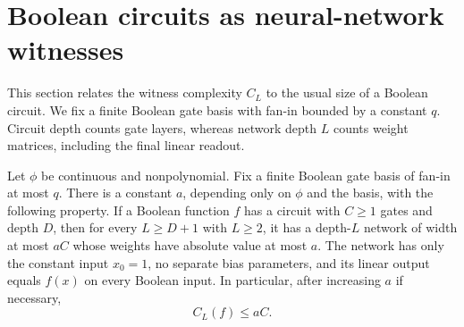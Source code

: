 \section{Boolean circuits as neural-network witnesses}
\label{sec:circuit-simulation}

This section relates the witness complexity $C_L$ to the usual size of a
Boolean circuit. We fix a finite Boolean gate basis with fan-in bounded by a
constant $q$. Circuit depth counts gate layers, whereas network depth $L$
counts weight matrices, including the final linear readout.

\begin{proposition}
\label{prop:circuit-simulation}
Let $\phi$ be continuous and nonpolynomial. Fix a finite Boolean gate basis
of fan-in at most $q$. There is a constant $a$, depending only on $\phi$
and the basis, with the following property. If a Boolean function $f$ has
a circuit with $C\geq1$ gates and depth $D$, then for every $L\geq D+1$
with $L\geq2$, it has a depth-$L$ network of width at most $aC$ whose
weights have absolute value at most $a$. The network has only the constant
input $x_0=1$, no separate bias parameters, and its linear output equals
$f(x)$ on every Boolean input. In particular, after increasing $a$ if necessary,
\[
 C_L(f)\leq aC.
\]
\end{proposition}

